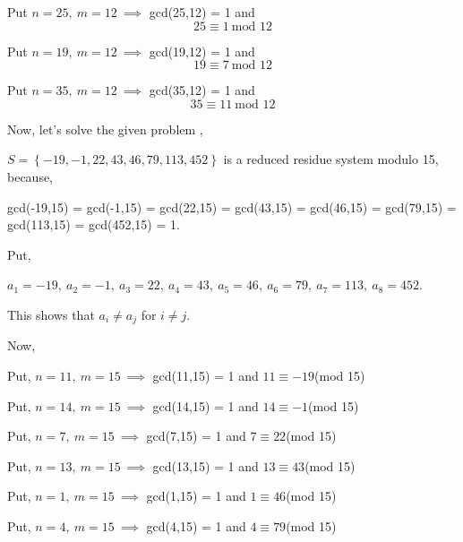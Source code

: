 \documentclass[a4paper,12pt]{article}
\begin{document}
    Put $n = 25,\ m = 12\ \implies$ gcd(25,12) = 1 and
    $$25\equiv 1\ \mbox{mod 12}$$

    Put $n = 19,\ m = 12\ \implies$ gcd(19,12) = 1 and
    $$19\equiv 7\ \mbox{mod 12}$$

    Put $n = 35,\ m = 12\ \implies$ gcd(35,12) = 1 and
    $$35\equiv 11\ \mbox{mod 12}$$

    \vspace*{0.3cm}

    Now, let's solve the given problem ,
    \vspace*{0.3cm}

    $S = \left\{-19,-1,22,43,46,79,113,452\right\}$ is a reduced residue system modulo 15, because,

    \vspace*{0.3cm}

    gcd(-19,15) = gcd(-1,15) = gcd(22,15) = gcd(43,15) = gcd(46,15) = gcd(79,15) = gcd(113,15) = gcd(452,15) = 1. 

    \vspace*{0.3cm}

    Put,

    $a_1 = -19,\ a_2 = -1,\ a_3 = 22,\ a_4 = 43,\ a_5 = 46,\ a_6 = 79,\ a_7 = 113,\ a_8 = 452$.


    \vspace*{0.3cm}

    This shows that $a_i\neq a_j$ for $i\neq j$.

    \vspace*{0.3cm}
    Now,

    Put, $n = 11,\ m=15\ \implies$ gcd(11,15) = 1  and $11\equiv -19$(mod 15)


    \vspace*{0.3cm}
    Put, $n = 14,\ m=15\ \implies$ gcd(14,15) = 1  and $14\equiv -1$(mod 15)


    \vspace*{0.3cm}
    Put, $n = 7,\ m=15\ \implies$ gcd(7,15) = 1  and $7\equiv 22$(mod 15)


    \vspace*{0.3cm}
    Put, $n = 13,\ m=15\ \implies$ gcd(13,15) = 1  and $13\equiv 43$(mod 15)



    \vspace*{0.3cm}
    Put, $n = 1,\ m=15\ \implies$ gcd(1,15) = 1  and $1\equiv 46$(mod 15)



    \vspace*{0.3cm}
    Put, $n = 4,\ m=15\ \implies$ gcd(4,15) = 1  and $4\equiv 79$(mod 15)
\end{document}
